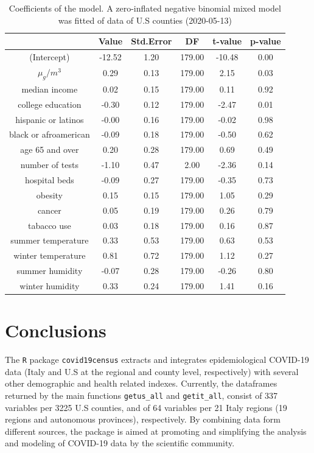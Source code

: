 \documentclass[12pt,halfline,a4paper,]{ouparticle}
\begin{document}
\begin{table}[ht]
\centering
\begin{tabular}{cccccc}
  \hline
 & Value & Std.Error & DF & t-value & p-value \\ 
  \hline
(Intercept) & -12.52 & 1.20 & 179.00 & -10.48 & 0.00 \\ 
  $\mu_g/m^3$ & 0.29 & 0.13 & 179.00 & 2.15 & 0.03 \\ 
  median income & 0.02 & 0.15 & 179.00 & 0.11 & 0.92 \\ 
  college education & -0.30 & 0.12 & 179.00 & -2.47 & 0.01 \\ 
  hispanic or latinos & -0.00 & 0.16 & 179.00 & -0.02 & 0.98 \\ 
  black or afroamerican & -0.09 & 0.18 & 179.00 & -0.50 & 0.62 \\ 
  age 65 and over & 0.20 & 0.28 & 179.00 & 0.69 & 0.49 \\ 
  number of tests & -1.10 & 0.47 & 2.00 & -2.36 & 0.14 \\ 
  hospital beds & -0.09 & 0.27 & 179.00 & -0.35 & 0.73 \\ 
  obesity & 0.15 & 0.15 & 179.00 & 1.05 & 0.29 \\ 
  cancer & 0.05 & 0.19 & 179.00 & 0.26 & 0.79 \\ 
  tabacco use & 0.03 & 0.18 & 179.00 & 0.16 & 0.87 \\ 
  summer temperature & 0.33 & 0.53 & 179.00 & 0.63 & 0.53 \\ 
  winter temperature & 0.81 & 0.72 & 179.00 & 1.12 & 0.27 \\ 
  summer humidity & -0.07 & 0.28 & 179.00 & -0.26 & 0.80 \\ 
  winter humidity & 0.33 & 0.24 & 179.00 & 1.41 & 0.16 \\ 
   \hline
\end{tabular}
\caption{Coefficients of the model. A zero-inflated negative binomial mixed model was fitted of data of U.S counties (2020-05-13)} 
\label{tab:tab_coef}
\end{table}

\hypertarget{conclusions}{%
\section{Conclusions}\label{conclusions}}

The \texttt{R} package \texttt{covid19census} extracts and integrates
epidemiological COVID-19 data (Italy and U.S at the regional and county
level, respectively) with several other demographic and health related
indexes. Currently, the dataframes returned by the main functions
\texttt{getus\_all} and \texttt{getit\_all}, consist of 337 variables
per 3225 U.S counties, and of 64 variables per 21 Italy regions (19
regions and autonomous provinces), respectively. By combining data form
different sources, the package is aimed at promoting and simplifying the
analysis and modeling of COVID-19 data by the scientific community.
\end{document}
